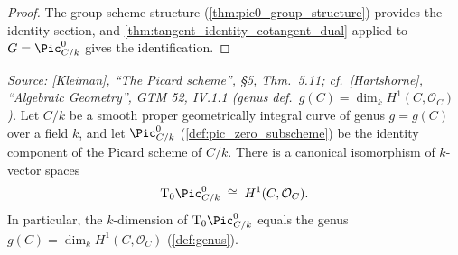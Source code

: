 \begin{proof}\leanok
  The group-scheme structure (\cref{thm:pic0_group_structure})
  provides the identity section, and
  \cref{thm:tangent_identity_cotangent_dual} applied to
  \(G = \Pic^0_{C/k}\) gives the identification.
\end{proof}


\begin{theorem}
  \label{thm:pic0_tangent_space_iso}

  \textit{Source: [Kleiman], ``The Picard scheme'', \S 5,
  Thm.~5.11; cf.\ [Hartshorne], ``Algebraic Geometry'', GTM 52,
  IV.1.1 (genus def.\ \(g(C) = \dim_k H^1(C, \mathcal{O}_C)\)).}
  Let \(C/k\) be a smooth proper geometrically integral curve of genus
  \(g = g(C)\) over a field \(k\), and let \(\Pic^0_{C/k}\)
  (\cref{def:pic_zero_subscheme}) be the identity component of the
  Picard scheme of \(C/k\). There is a canonical isomorphism of
  \(k\)-vector spaces
  \[
    \tu T_0 \Pic^0_{C/k} \;\cong\; H^1(C, \mathcal{O}_C).
  \]
  In particular, the \(k\)-dimension of \(\tu T_0 \Pic^0_{C/k}\) equals
  the genus \(g(C) = \dim_k H^1(C, \mathcal{O}_C)\)
  (\cref{def:genus}).
\end{theorem}

